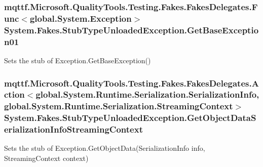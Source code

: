\hypertarget{class_system_1_1_fakes_1_1_stub_type_unloaded_exception_a6f43992d6b2936d4dafc690c15d8afbd}{
\subsubsection[{Get\-Base\-Exception01}]{\setlength{\rightskip}{0pt plus 5cm}mqttf.\-Microsoft.\-Quality\-Tools.\-Testing.\-Fakes.\-Fakes\-Delegates.\-Func$<$global.\-System.\-Exception$>$ System.\-Fakes.\-Stub\-Type\-Unloaded\-Exception.\-Get\-Base\-Exception01}}\label{class_system_1_1_fakes_1_1_stub_type_unloaded_exception_a6f43992d6b2936d4dafc690c15d8afbd}


Sets the stub of Exception.\-Get\-Base\-Exception()

\hypertarget{class_system_1_1_fakes_1_1_stub_type_unloaded_exception_af39656d1af227ab51f52434c3192a169}{
\subsubsection[{Get\-Object\-Data\-Serialization\-Info\-Streaming\-Context}]{\setlength{\rightskip}{0pt plus 5cm}mqttf.\-Microsoft.\-Quality\-Tools.\-Testing.\-Fakes.\-Fakes\-Delegates.\-Action$<$global.\-System.\-Runtime.\-Serialization.\-Serialization\-Info, global.\-System.\-Runtime.\-Serialization.\-Streaming\-Context$>$ System.\-Fakes.\-Stub\-Type\-Unloaded\-Exception.\-Get\-Object\-Data\-Serialization\-Info\-Streaming\-Context}}\label{class_system_1_1_fakes_1_1_stub_type_unloaded_exception_af39656d1af227ab51f52434c3192a169}


Sets the stub of Exception.\-Get\-Object\-Data(\-Serialization\-Info info, Streaming\-Context context)

